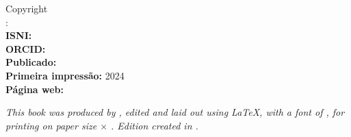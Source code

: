 \cleardoublepage %

\begin{slide-frame}
\end{slide-frame}

\newpage
\noindent Copyright \textcopyright\ \BookEditionYear\ \BookAuthor\\ %
\noindent \BookTitle:\BookSubTitle\\

\noindent \textbf{ISNI:} \AuthorNumberISNI\\
\noindent \textbf{ORCID:} \AuthorNumberOrcid\\

\noindent \textbf{Publicado:} \BookPublishingEditor\\ %
\noindent \textbf{Primeira impressão:} 2024\\ %
\noindent \textbf{Página web:} \BookHomePage\\ %

\vfill
\thispagestyle{empty}

{%
\normalsize \itshape This book was produced by \BookAuthor, %
edited and laid out using \LaTeX, %
with a font of \FprShowFont, %
for printing on paper size \BookPaperHeight $\times$ \BookPaperWidth. %
Edition created in \BookEditionYear.%
}

